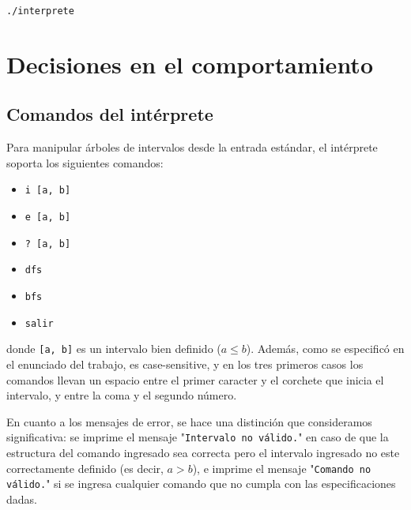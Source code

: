 \documentclass[11pt]{article}
\begin{document}
 \noindent \verb|./interprete| \par
 
 
 \section{Decisiones en el comportamiento}
 
 \subsection{Comandos del intérprete}
 
 Para manipular árboles de intervalos desde la entrada estándar, el intérprete soporta los siguientes comandos:
 
 \vspace{-0.5cm}
 \begin{itemize}
     \item \verb|i [a, b]|
     \vspace{-0.3cm}
     \item \verb|e [a, b]|
     \vspace{-0.3cm}
     \item \verb|? [a, b]|
     \vspace{-0.3cm}
     \item \verb|dfs|
     \vspace{-0.3cm}
     \item \verb|bfs|
     \vspace{-0.3cm}
     \item \verb|salir|
 \end{itemize}
 \vspace{-0.5cm}
 
 \noindent donde \verb|[a, b]| es un intervalo bien definido ($a \le b$).
 Además, como se especificó en el enunciado del trabajo, es case-sensitive, y en los tres primeros casos los comandos llevan un espacio entre el primer caracter y el corchete que inicia el intervalo, y entre la coma y el segundo número. \par
 
 En cuanto a los mensajes de error, se hace una distinción que consideramos significativa: se imprime el mensaje "\verb|Intervalo no válido.|" en caso de que la estructura del comando ingresado sea correcta pero el intervalo ingresado no este correctamente definido (es decir, $a > b$), e imprime el mensaje "\verb|Comando no válido.|" si se ingresa cualquier comando que no cumpla con las especificaciones dadas. \par
 
\end{document}
